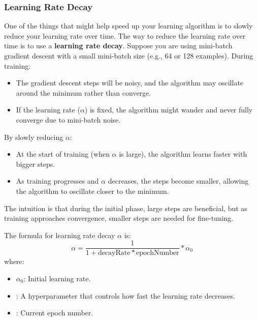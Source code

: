 \documentclass[letterpaper,12pt,notitlepage,twoside]{report}
\begin{document}
\subsubsection{Learning Rate Decay}
One of the things that might help speed up your learning algorithm is to slowly reduce your learning rate over time. The way to reduce the learning rate over time is to use a \textbf{learning rate decay}.  Suppose you are using mini-batch gradient descent with a small mini-batch size (e.g., 64 or 128 examples). During training:
\begin{itemize}[noitemsep, topsep=0pt]
    \item The gradient descent steps will be noisy, and the algorithm may oscillate around the minimum rather than converge.
    \item If the learning rate (\( \alpha \)) is fixed, the algorithm might wander and never fully converge due to mini-batch noise.
\end{itemize}

By slowly reducing \( \alpha \):
\begin{itemize}[noitemsep, topsep=0pt]
    \item At the start of training (when \( \alpha \) is large), the algorithm learns faster with bigger steps.
    \item As training progresses and \( \alpha \) decreases, the steps become smaller, allowing the algorithm to oscillate closer to the minimum.
\end{itemize}

The intuition is that during the initial phase, large steps are beneficial, but as training approaches convergence, smaller steps are needed for fine-tuning.

The formula for learning rate decay \(\alpha\) is:
\[ \alpha = \frac{1}{1+\text{decayRate}*\text{epochNumber}}*\alpha_0\]
where:
\begin{itemize}[noitemsep, topsep=0pt]
    \item \( \alpha_0 \): Initial learning rate.
    \item {}: A hyperparameter that controls how fast the learning rate decreases.
    \item {}: Current epoch number.
\end{itemize}
\end{document}
